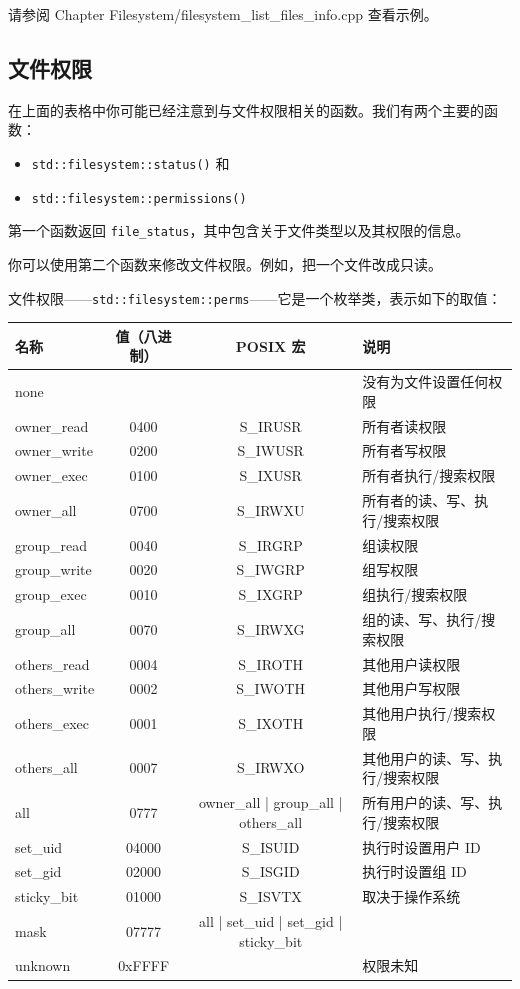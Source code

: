 请参阅 Chapter Filesystem/filesystem\_list\_files\_info.cpp 查看示例。

\subsection{文件权限}

在上面的表格中你可能已经注意到与文件权限相关的函数。我们有两个主要的函数：

\begin{itemize}
\item \texttt{std::filesystem::status()} 和
\item \texttt{std::filesystem::permissions()}
\end{itemize}

第一个函数返回 \texttt{file\_status}，其中包含关于文件类型以及其权限的信息。

你可以使用第二个函数来修改文件权限。例如，把一个文件改成只读。

文件权限——\texttt{std::filesystem::perms}——它是一个枚举类，表示如下的取值：

\begin{table}[H]
\centering
\begin{tabularx}{\textwidth}{>{\ttfamily\raggedright\arraybackslash}X c >{\ttfamily}c >{\raggedright\arraybackslash}X}
\toprule
名称 & 值（八进制） & POSIX 宏 & 说明 \\
\midrule
none & & & 没有为文件设置任何权限 \\
owner\_read & 0400 & S\_IRUSR & 所有者读权限 \\
owner\_write & 0200 & S\_IWUSR & 所有者写权限 \\
owner\_exec & 0100 & S\_IXUSR & 所有者执行/搜索权限 \\
owner\_all & 0700 & S\_IRWXU & 所有者的读、写、执行/搜索权限 \\
group\_read & 0040 & S\_IRGRP & 组读权限 \\
group\_write & 0020 & S\_IWGRP & 组写权限 \\
group\_exec & 0010 & S\_IXGRP & 组执行/搜索权限 \\
group\_all & 0070 & S\_IRWXG & 组的读、写、执行/搜索权限 \\
others\_read & 0004 & S\_IROTH & 其他用户读权限 \\
others\_write & 0002 & S\_IWOTH & 其他用户写权限 \\
others\_exec & 0001 & S\_IXOTH & 其他用户执行/搜索权限 \\
others\_all & 0007 & S\_IRWXO & 其他用户的读、写、执行/搜索权限 \\
all & 0777 & owner\_all | group\_all | others\_all & 所有用户的读、写、执行/搜索权限 \\
set\_uid & 04000 & S\_ISUID & 执行时设置用户 ID \\
set\_gid & 02000 & S\_ISGID & 执行时设置组 ID \\
sticky\_bit & 01000 & S\_ISVTX & 取决于操作系统 \\
mask & 07777 & all | set\_uid | set\_gid | sticky\_bit & \\
unknown & 0xFFFF & & 权限未知 \\
\bottomrule
\end{tabularx}
\end{table}

